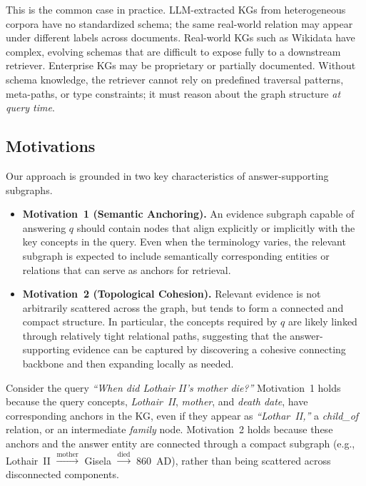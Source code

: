 This is the common case in practice. LLM-extracted KGs from heterogeneous corpora have no standardized schema; the same real-world relation may appear under different labels across documents. Real-world KGs such as Wikidata have complex, evolving schemas that are difficult to expose fully to a downstream retriever. Enterprise KGs may be proprietary or partially documented. Without schema knowledge, the retriever cannot rely on predefined traversal patterns, meta-paths, or type constraints; it must reason about the graph structure \emph{at query time}.



\subsection{Motivations}

Our approach is grounded in two key characteristics of answer-supporting subgraphs.

\begin{itemize}[leftmargin=*]
    \item \textbf{Motivation~1 (Semantic Anchoring).}\label{motiva:anchor}
    An evidence subgraph capable of answering $q$ should contain nodes that align explicitly or implicitly with the key concepts in the query. Even when the terminology varies, the relevant subgraph is expected to include semantically corresponding entities or relations that can serve as anchors for retrieval.
    \item \textbf{Motivation~2 (Topological Cohesion).\label{motiva:topo}}
    Relevant evidence is not arbitrarily scattered across the graph, but tends to form a connected and compact structure. In particular, the concepts required by $q$ are likely linked through relatively tight relational paths, suggesting that the answer-supporting evidence can be captured by discovering a cohesive connecting backbone and then expanding locally as needed.
\end{itemize}

\begin{exmp}
Consider the query \textit{``When did Lothair II's mother die?''} Motivation~1 holds because the query concepts, \textit{Lothair~II}, \textit{mother}, and \textit{death date}, have corresponding anchors in the KG, even if they appear as \textit{``Lothar~II,''} a \textit{child\_of} relation, or an intermediate \textit{family} node. Motivation~2 holds because these anchors and the answer entity are connected through a compact subgraph (e.g., Lothair~II $\xrightarrow{\text{mother}}$ Gisela $\xrightarrow{\text{died}}$ 860~AD), rather than being scattered across disconnected components.
\end{exmp}

